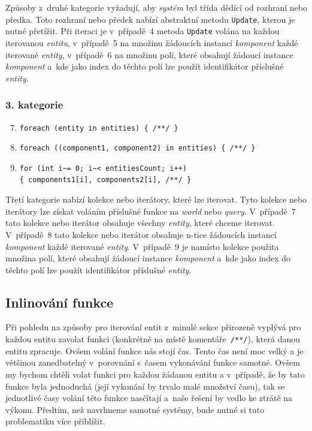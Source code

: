 Způsoby z~druhé kategorie vyžadují, aby \textit{systém} byl třída dědící od rozhraní nebo předka. Toto rozhraní nebo předek nabízí abstraktní metodu \verb|Update|, kterou je nutné přetížit. Při iteraci je v~případě~4 metoda \verb|Update| volána na každou iterovanou \textit{entitu}, v~případě~5 na množinu žádoucích instancí \textit{komponent} každé iterované \textit{entity}, v~případě~6 na množinu polí, které obsahují žádoucí instance \textit{komponent} a~kde jako index do těchto polí lze použít identifikátor příslušné \textit{entity}.

\subsubsection{3. kategorie}

\begin{enumerate}
    \setcounter{enumi}{6}
    \item \verb|foreach (entity in entities) { /**/ }|
    \item \verb|foreach ((component1, component2) in entities) { /**/ }|
    \item \verb|for (int i~= 0; i~< entitiesCount; i++)|\\\verb|{ components1[i], components2[i], /**/ }|
\end{enumerate}

Třetí kategorie nabízí kolekce nebo iterátory, které lze iterovat. Tyto kolekce nebo iterátory lze získat voláním příslušné funkce na \textit{world} nebo \textit{query}. V~případě~7 tato kolekce nebo iterátor obsahuje všechny \textit{entity}, které chceme iterovat. V~případě~8 tato kolekce nebo iterátor obsahuje n-tice žádoucích instancí \textit{komponent} každé iterované \textit{entity}. V~případě~9 je namísto kolekce použita množina polí, které obsahují žádoucí instance \textit{komponent} a~kde jako index do těchto polí lze použít identifikátor příslušné \textit{entity}.

\subsection{Inlinování funkce}
Při pohledu na způsoby pro iterování entit z~minulé sekce přirozeně vyplývá pro každou entitu zavolat funkci (konkrétně na místě komentáře~\verb|/**/|), která danou entitu zpracuje. Ovšem volání funkce nás stojí čas. Tento čas není moc velký a je většinou zanedbatelný v~porovnání s~časem vykonávání funkce samotné. Ovšem my bychom chtěli volat funkci pro každou žádanou entitu a v~případě, že by tato funkce byla jednoduchá (její vykonání by trvalo malé množství času), tak se jednotlivé časy volání této funkce nasčítají a~naše řešení by vedlo ke ztrátě na výkonu. Předtím, než navrhneme samotné systémy, bude nutné si tuto problematiku více přiblížit.

